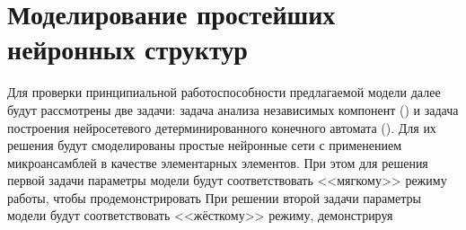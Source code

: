 \section{Моделирование простейших нейронных структур} \label{section:neuron_modeling}

Для проверки принципиальной работоспособности предлагаемой модели далее будут рассмотрены две задачи: задача анализа независимых компонент () и задача построения нейросетевого детерминированного конечного автомата (). Для их решения будут смоделированы простые нейронные сети с применением микроансамблей в качестве элементарных элементов. При этом для решения первой задачи параметры модели будут соответствовать <<мягкому>> режиму работы, чтобы продемонстрировать  При решении второй задачи параметры модели будут соответствовать <<жёсткому>> режиму, демонстрируя

